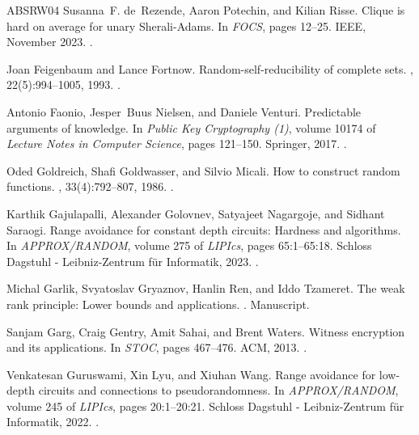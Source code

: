 \documentclass[10pt,a4paper]{article}
\theoremstyle{definition}
\theoremstyle{remark}
\begin{document}
\begin{thebibliography}{ABSRW04}
Susanna~F. de~Rezende, Aaron Potechin, and Kilian Risse.
\newblock Clique is hard on average for unary {S}herali-{A}dams.
\newblock In {\em {FOCS}}, pages 12--25. IEEE, November 2023.
\newblock \href {https://doi.org/10.1109/FOCS57990.2023.00008}
  {}.

Joan Feigenbaum and Lance Fortnow.
\newblock Random-self-reducibility of complete sets.
, 22(5):994--1005, 1993.
\newblock \href {https://doi.org/10.1137/0222061} {}.

Antonio Faonio, Jesper~Buus Nielsen, and Daniele Venturi.
\newblock Predictable arguments of knowledge.
\newblock In {\em Public Key Cryptography {(1)}}, volume 10174 of {\em Lecture
  Notes in Computer Science}, pages 121--150. Springer, 2017.
\newblock \href {https://doi.org/10.1007/978-3-662-54365-8\_6}
  {}.

Oded Goldreich, Shafi Goldwasser, and Silvio Micali.
\newblock How to construct random functions.
, 33(4):792--807, 1986.
\newblock \href {https://doi.org/10.1145/6490.6503}
  {}.

Karthik Gajulapalli, Alexander Golovnev, Satyajeet Nagargoje, and Sidhant
  Saraogi.
\newblock Range avoidance for constant depth circuits: Hardness and algorithms.
\newblock In {\em {APPROX/RANDOM}}, volume 275 of {\em LIPIcs}, pages
  65:1--65:18. Schloss Dagstuhl - Leibniz-Zentrum f{\"{u}}r Informatik, 2023.
\newblock \href {https://doi.org/10.4230/LIPICS.APPROX/RANDOM.2023.65}
  {}.

Michal Garlik, Svyatoslav Gryaznov, Hanlin Ren, and Iddo Tzameret.
\newblock The weak rank principle: Lower bounds and applications.
.
\newblock Manuscript.

Sanjam Garg, Craig Gentry, Amit Sahai, and Brent Waters.
\newblock Witness encryption and its applications.
\newblock In {\em {STOC}}, pages 467--476. {ACM}, 2013.
\newblock \href {https://doi.org/10.1145/2488608.2488667}
  {}.

Venkatesan Guruswami, Xin Lyu, and Xiuhan Wang.
\newblock Range avoidance for low-depth circuits and connections to
  pseudorandomness.
\newblock In {\em {APPROX/RANDOM}}, volume 245 of {\em LIPIcs}, pages
  20:1--20:21. Schloss Dagstuhl - Leibniz-Zentrum f{\"{u}}r Informatik, 2022.
\newblock \href {https://doi.org/10.4230/LIPICS.APPROX/RANDOM.2022.20}
  {}.


\end{thebibliography}
\end{document}
